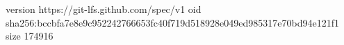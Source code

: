 version https://git-lfs.github.com/spec/v1
oid sha256:bccbfa7e8e9c952242766653fc40f719d518928e049ed985317e70bd94e121f1
size 174916

